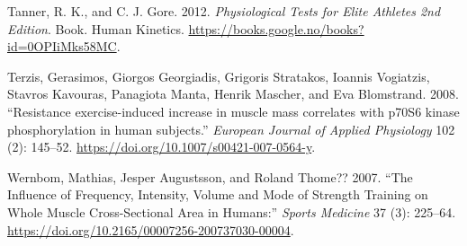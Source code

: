 \documentclass[
  letterpaper,
  DIV=11,
  numbers=noendperiod]{scrreprt}
\newlength{\cslhangindent}
\newenvironment{CSLReferences}[2] %
 {\begin{list}{}{%
  \setlength{\itemindent}{0pt}
  \setlength{\leftmargin}{0pt}
  \setlength{\parsep}{0pt}
  \ifodd #1
   \setlength{\leftmargin}{\cslhangindent}
   \setlength{\itemindent}{-1\cslhangindent}
  \fi
  \setlength{\itemsep}{#2\baselineskip}}}
 {\end{list}}
\begin{document}
\begin{CSLReferences}{1}{0}
Tanner, R. K., and C. J. Gore. 2012. \emph{Physiological Tests for Elite
Athletes 2nd Edition}. Book. Human Kinetics.
\url{https://books.google.no/books?id=0OPIiMks58MC}.

Terzis, Gerasimos, Giorgos Georgiadis, Grigoris Stratakos, Ioannis
Vogiatzis, Stavros Kavouras, Panagiota Manta, Henrik Mascher, and Eva
Blomstrand. 2008. {``Resistance exercise-induced increase in muscle mass
correlates with p70S6 kinase phosphorylation in human subjects.''}
\emph{European Journal of Applied Physiology} 102 (2): 145--52.
\url{https://doi.org/10.1007/s00421-007-0564-y}.

Wernbom, Mathias, Jesper Augustsson, and Roland Thome?? 2007. {``The
Influence of Frequency, Intensity, Volume and Mode of Strength Training
on Whole Muscle Cross-Sectional Area in Humans:''} \emph{Sports
Medicine} 37 (3): 225--64.
\url{https://doi.org/10.2165/00007256-200737030-00004}.

\end{CSLReferences}
\end{document}

